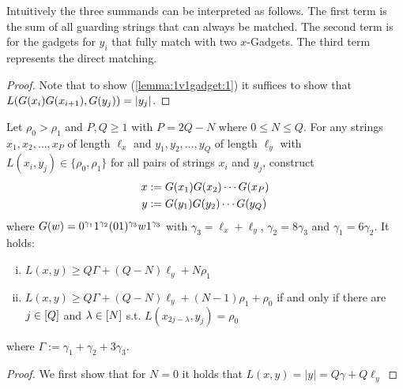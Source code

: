 Intuitively the three summands can be interpreted as follows.
The first term is the sum of all guarding strings that can always be matched.
The second term is for the gadgets for $y_i$ that fully match with two $x$-Gadgets.
The third term represents the direct matching.


\begin{proof}
Note that to show (\ref{lemma:1v1gadget:1}) it suffices to show that $L(G(x_i)G(x_{i+1}), G(y_j)) = |y_j|$.

\end{proof}




\begin{lemma}
Let $\rho_0 > \rho_1$ and $P, Q \geq 1$ with $P = 2Q - N$ where $0 \leq N \leq Q$.
For any strings $x_1, x_2, \ldots, x_P$ of length $\ell_x$ and $y_1, y_2, \ldots, y_Q$ of length $\ell_y$ with $L(x_i, y_j) \in \{\rho_0, \rho_1\}$ for all pairs of strings $x_i$ and $y_j$, construct
\begin{align*}
	x &:= G(x_1)G(x_2) \cdots G(x_P)\\
	y &:= G(y_1)G(y_2) \cdots G(y_Q)
\end{align*}
where $G(w) = 0^{\gamma_1}1^{\gamma_2}(01)^{\gamma_3}w1^{\gamma_3}$ with $\gamma_3 = \ell_x + \ell_y$, $\gamma_2 = 8\gamma_3$ and $\gamma_1 = 6\gamma_2$.
It holds:

\begin{enumerate}[(i)]
\item $L(x,y) \geq Q\Gamma + (Q-N)\ell_y + N\rho_1$
\item $L(x,y) \geq Q\Gamma + (Q-N)\ell_y + (N-1)\rho_1 + \rho_0$ if and only if there are $j \in [Q]$ and $\lambda \in [N]$ s.t. $L(x_{2j-\lambda}, y_j) = \rho_0$
\end{enumerate}
%
where $\Gamma := \gamma_1 + \gamma_2 + 3\gamma_3$.

\end{lemma}

\begin{proof}
We first show that for $N=0$ it holds that $L(x,y) = |y| = Q\gamma + Q\ell_y$

\end{proof}

